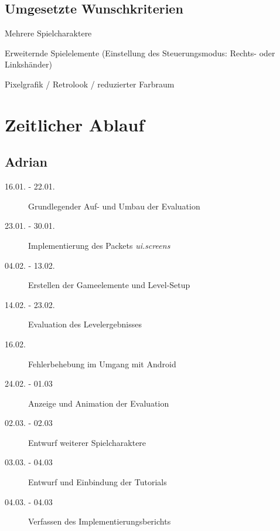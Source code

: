 \documentclass[parskip=full]{scrreprt}
\begin{document}
\section{Umgesetzte Wunschkriterien}

\begin{description}
	\item Mehrere Spielcharaktere
	\item Erweiternde Spielelemente (Einstellung des Steuerungsmodus: Rechts- oder Linkshänder)
	\item Pixelgrafik / Retrolook / reduzierter Farbraum
\end{description}

\chapter{Zeitlicher Ablauf}

\section{Adrian}

\begin{description}
	\item[16.01. - 22.01.] 
		Grundlegender Auf- und Umbau der Evaluation
	\item[23.01. - 30.01.] 
		Implementierung des Packets \emph{ui.screens}
	\item[04.02. - 13.02.] 
		Erstellen der Gameelemente und Level-Setup
	\item[14.02. - 23.02.] 
		Evaluation des Levelergebnisses
	\item[16.02.]
		Fehlerbehebung im Umgang mit Android
	\item[24.02. - 01.03]
		Anzeige und Animation der Evaluation
	\item[02.03. - 02.03] 
		Entwurf weiterer Spielcharaktere
	\item[03.03. - 04.03] 
		Entwurf und Einbindung der Tutorials
	\item[04.03. - 04.03]
		Verfassen des Implementierungsberichts
\end{description}
\end{document}
